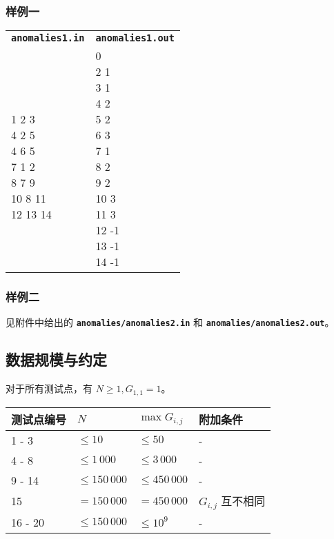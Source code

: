 \documentclass[UTF8, 11pt, a4paper]{article}
\begin{document}
\subsubsection*{样例一}
\begin{table}[h]\centering
\begin{tabularx}{0.8 \textwidth}{|X|X|}
\hline
\texttt{\textbf{anomalies1.in}} & \texttt{\textbf{anomalies1.out}} \\ \hline
{\ttfamily
7\newline
1 2 3\newline
4 2 5\newline
4 6 5\newline
7 1 2\newline
8 7 9\newline
10 8 11\newline
12 13 14
} & {\ttfamily
1 0\newline
2 1\newline
3 1\newline
4 2\newline
5 2\newline
6 3\newline
7 1\newline
8 2\newline
9 2\newline
10 3\newline
11 3\newline
12 -1\newline
13 -1\newline
14 -1
}
\\ \hline
\end{tabularx}\end{table}

\subsubsection*{样例二}
见附件中给出的 \texttt{\textbf{anomalies/anomalies2.in}} 和 \texttt{\textbf{anomalies/anomalies2.out}}。

\subsection*{数据规模与约定}
对于所有测试点，有 $N \geq 1, G_{1, 1} = 1$。

\begin{table}[h]\centering
\begin{tabularx}{0.85 \textwidth}{X|X|X|X} \hline
测试点编号 & $N$             & $\max{G_{i,j}}$ & 附加条件 \\ \hline\hline
1 - 3      & $\leq 10$       & $\leq 50$       & - \\ \hline
4 - 8      & $\leq 1\,000$   & $\leq 3\,000$   & - \\ \hline
9 - 14     & $\leq 150\,000$ & $\leq 450\,000$ & - \\ \hline
15         & $= 150\,000$    & $= 450\,000$    & $G_{i,j}$ 互不相同 \\ \hline
16 - 20    & $\leq 150\,000$ & $\leq 10^9$     & - \\ \hline
\end{tabularx}
\end{table}
\newpage
\end{document}
